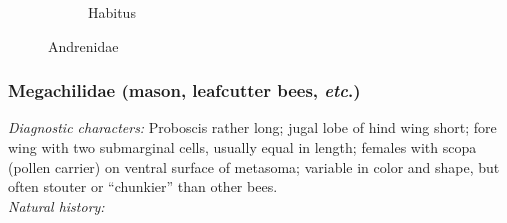 \documentclass[letterpaper, 11pt]{article}
\begin{document}
\begin{figure}[ht!]
\begin{subfigure}[ht!]{0.38\textwidth}
        \caption{Habitus \citep[][Fig. 116]{goulet1993hymenoptera}}
        \label{fig:andrenid2}
    \end{subfigure}
    \caption{Andrenidae}\label{fig:andrenids}
\end{figure}

\subsubsection{Megachilidae (mason, leafcutter bees, \textit{etc}.)}
\noindent{}\textit{Diagnostic characters:} Proboscis rather long; jugal lobe of hind wing short; fore wing with two submarginal cells, usually equal in length; females with scopa (pollen carrier) on ventral surface of metasoma; variable in color and shape, but often stouter or ``chunkier'' than other bees.\\

\noindent{}\textit{Natural history:} \\
\end{document}

